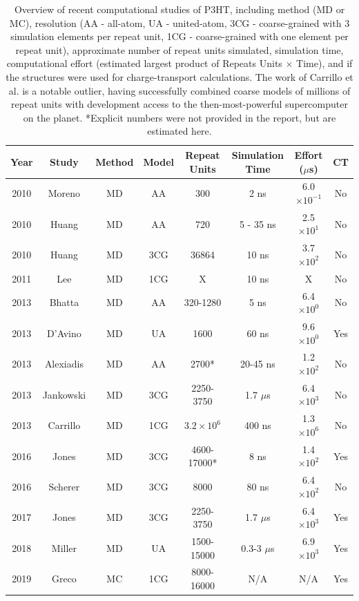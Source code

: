\begin{table}
    \caption{Overview of recent computational studies of P3HT, including method (MD or MC), resolution (AA - all-atom, UA - united-atom, 3CG - coarse-grained with 3 simulation elements per repeat unit, 1CG - coarse-grained with one element per repeat unit), approximate number of repeat units simulated, simulation time, computational effort (estimated largest product of Repeats Units $\times$ Time), and if the structures were used for charge-transport calculations. 
    The work of Carrillo et al.\cite{Carrillo2013} is a notable outlier, having successfully combined coarse models of millions of repeat units with development access to the then-most-powerful supercomputer on the planet.
    *Explicit numbers were not provided in the report, but are estimated here.}
\centering
\begin{tabular}{|c|c|c|c|c|c|c|c|}
\hline
    Year & Study & Method & Model & Repeat Units & Simulation Time & Effort ($\mu$s)  & CT \\
\hline
    2010 & Moreno\cite{Moreno2010} & MD & AA & 300 & 2 ns & 6.0$\times 10^{-1}$  & No \\%
\hline
    2010 & Huang\cite{Huang2010} & MD & AA & 720 & 5 - 35 ns & 2.5$\times 10^{1}$  & No \\
\hline
    2010 & Huang\cite{Huang2010} & MD & 3CG & 36864 & 10 ns & 3.7$\times 10^{2}$  & No \\
\hline
    2011 & Lee\cite{Lee2011} & MD & 1CG & X & 10 ns & X  & No \\
\hline
    2013 & Bhatta\cite{Bhatta2013a} & MD & AA & 320-1280 & 5 ns & 6.4$\times 10^{0}$  & No \\%
\hline
    2013 & D'Avino\cite{DAvino2013} & MD & UA & 1600 & 60 ns & 9.6$\times 10^{0}$  & Yes \\
\hline
    2013 & Alexiadis\cite{Alexiadis2013} & MD & AA & 2700* & 20-45 ns & 1.2$\times 10^{2}$ & No \\
\hline
    2013 & Jankowski\cite{Jankowski2013} & MD & 3CG & 2250-3750 & 1.7 $\mu$s & 6.4$\times 10^{3}$  & No \\
\hline
    2013 & Carrillo\cite{Carrillo2013} & MD & 1CG & $3.2 \times 10^{6}$ & 400 ns & 1.3$\times 10^{6}$ & No \\
\hline
    2016 & Jones\cite{Jones2016} & MD & 3CG & 4600-17000* & 8 ns & 1.4$\times 10^{2}$  & Yes \\
\hline
    2016 & Scherer\cite{Scherer2016} & MD & 3CG & 8000 & 80 ns & 6.4$\times 10^{2}$  & No \\
\hline
    2017 & Jones\cite{Jones2017} & MD & 3CG & 2250-3750 & 1.7 $\mu$s & 6.4$\times 10^{3}$  & Yes \\
\hline
    2018 & Miller\cite{Miller2018, Miller2018a} & MD & UA & 1500-15000 & 0.3-3 $\mu$s & 6.9$\times 10^{3}$  & Yes \\
\hline
    2019 & Greco\cite{Greco2019} & MC & 1CG & 8000-16000 & N/A & N/A  & Yes \\
\hline
\end{tabular}
\label{table:p3ht-simulations}
\end{table}

